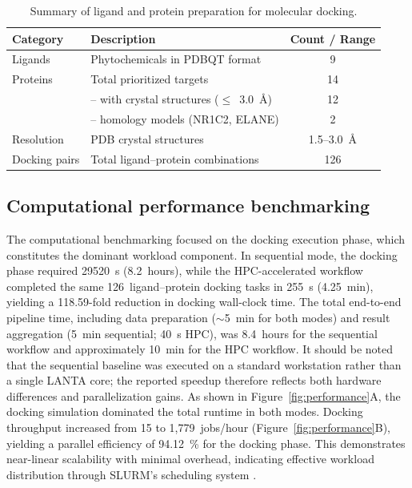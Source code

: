 \documentclass[11pt,a4paper]{article}
\begin{document}
\begin{table}[!ht]
\centering
\caption{Summary of ligand and protein preparation for molecular docking.}
\label{tab:docking-matrix}
\begin{tabular}{llc}
\toprule
\textbf{Category} & \textbf{Description} & \textbf{Count / Range} \\
\midrule
Ligands        & Phytochemicals in PDBQT format               & 9 \\
Proteins       & Total prioritized targets                     & 14 \\
               & -- with crystal structures ($\leq$~3.0~\AA{})   & 12 \\
               & -- homology models (NR1C2, ELANE)             & 2 \\
Resolution     & PDB crystal structures                        & 1.5--3.0~\AA{} \\
Docking pairs  & Total ligand--protein combinations            & 126 \\
\bottomrule
\end{tabular}
\end{table}


\subsection{Computational performance benchmarking}

The computational benchmarking focused on the docking execution phase, which constitutes the dominant workload component. In sequential mode, the docking phase required \SI{29520}{s} (\SI{8.2}{hours}), while the HPC-accelerated workflow completed the same 126~ligand--protein docking tasks in \SI{255}{s} (\SI{4.25}{min}), yielding a 118.59-fold reduction in docking wall-clock time. The total end-to-end pipeline time, including data preparation ($\sim$\SI{5}{min} for both modes) and result aggregation (\SI{5}{min} sequential; \SI{40}{s} HPC), was \SI{8.4}{hours} for the sequential workflow and approximately \SI{10}{min} for the HPC workflow. It should be noted that the sequential baseline was executed on a standard workstation rather than a single LANTA core; the reported speedup therefore reflects both hardware differences and parallelization gains. As shown in Figure~\ref{fig:performance}A, the docking simulation dominated the total runtime in both modes. Docking throughput increased from 15 to 1,779~jobs/hour (Figure~\ref{fig:performance}B), yielding a parallel efficiency of \SI{94.12}{\percent} for the docking phase. This demonstrates near-linear scalability with minimal overhead, indicating effective workload distribution through SLURM's scheduling system \cite{curia2024,simakov2018}.
\end{document}
